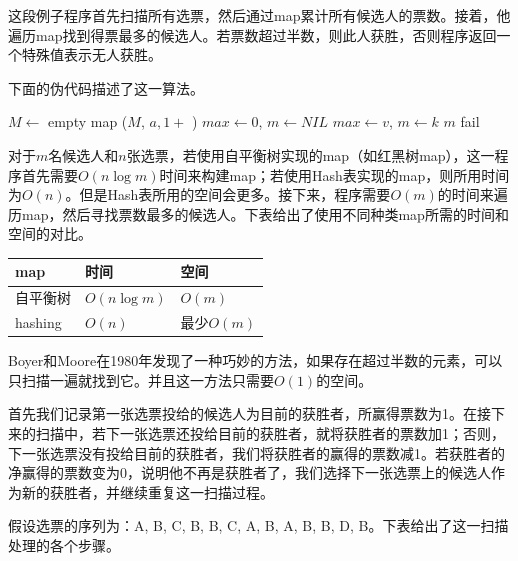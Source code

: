 \documentclass[UTF8]{article}
\begin{document}
这段例子程序首先扫描所有选票，然后通过map累计所有候选人的票数。接着，他遍历map找到得票最多的候选人。若票数超过半数，则此人获胜，否则程序返回一个特殊值表示无人获胜。

下面的伪代码描述了这一算法。

\begin{algorithmic}[1]
  \State $M \gets $ empty map
    \State {}($M$, $a, 1 + $ )
  \EndFor
  \State $max \gets 0$, $m \gets NIL$
      \State $max \gets v$, $m \gets k$
    \EndIf
  \EndFor
    \State \Return $m$
  \Else
    \State fail
  \EndIf
\EndFunction
\end{algorithmic}

对于$m$名候选人和$n$张选票，若使用自平衡树实现的map（如红黑树map），这一程序首先需要$O(n \log m)$时间来构建map；若使用Hash表实现的map，则所用时间为$O(n)$。但是Hash表所用的空间会更多。接下来，程序需要$O(m)$的时间来遍历map，然后寻找票数最多的候选人。下表给出了使用不同种类map所需的时间和空间的对比。

\begin{tabular}{|l|l|l|}
\hline
map & 时间 & 空间 \\
\hline
自平衡树 & $O(n \log m)$ & $O(m)$ \\
hashing & $O(n)$ & 最少$O(m)$ \\
\hline
\end{tabular}

Boyer和Moore在1980年发现了一种巧妙的方法，如果存在超过半数的元素，可以只扫描一遍就找到它。并且这一方法只需要$O(1)$的空间\cite{boyer-moore-majority}。

首先我们记录第一张选票投给的候选人为目前的获胜者，所赢得票数为1。在接下来的扫描中，若下一张选票还投给目前的获胜者，就将获胜者的票数加1；否则，下一张选票没有投给目前的获胜者，我们将获胜者的赢得的票数减1。若获胜者的净赢得的票数变为0，说明他不再是获胜者了，我们选择下一张选票上的候选人作为新的获胜者，并继续重复这一扫描过程。

假设选票的序列为：A, B, C, B, B, C, A, B, A, B, B, D, B。下表给出了这一扫描处理的各个步骤。
\end{document}
